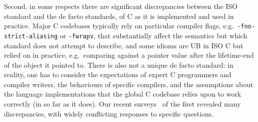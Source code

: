 \documentclass[acmsmall,review,screen]{acmart}\settopmatter{printfolios=true,printccs=false,printacmref=false}
\begin{document}
Second, in some respects there are significant discrepancies between
the ISO standard and the de facto standards, of C as it is implemented
and used in practice.  
Major C codebases typically rely on particular
compiler flags, e.g.~\texttt{-fno-strict-aliasing} or
\texttt{-fwrapv}, that substantially affect the semantics but which
standard does not attempt to describe, and 
some idioms are UB in ISO C but
relied on in practice, e.g.~comparing against a pointer value after 
the lifetime-end of the object it pointed to.
%
%
%
%
%
%
%
%
%
There is also not a unique de facto standard: in reality, one has
to consider
the expectations of expert C programmers and compiler writers,
the behaviours of specific compilers,
and 
the assumptions about the language implementations that the global C
   codebase relies upon to work correctly (in so far as it does). 
%
Our recent surveys~\cite{Cerberus-PLDI16,N2015} of the first revealed many
discrepancies, with widely conflicting responses to specific questions.
\end{document}
